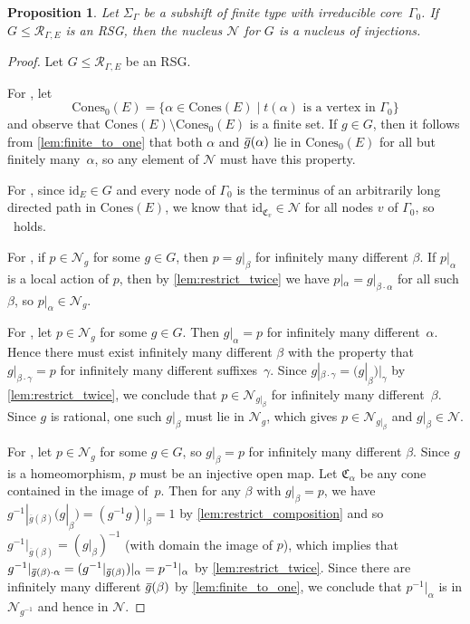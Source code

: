\documentclass[11pt,letterpaper]{amsart}
\newtheorem{proposition}[theorem]{Proposition}
\theoremstyle{definition}
\newcommand{\R}{\mathcal{R}}
\newcommand{\Nuc}{\mathcal{N}}
\newcommand{\C}{\mathfrak{C}}
\newcommand{\Cones}{\mathrm{Cones}}
\newcommand{\og}{\mkern 2mu\overline{\mkern-2mu g\mkern0.5mu}\mkern-0.5mu}
\begin{document}
\begin{proposition}\label{prop:NucleusHasProperties}
Let $\Sigma_\Gamma$ be a subshift of finite type with irreducible core~$\Gamma_0$. If $G\le \R_{\Gamma,E}$ is an RSG, then the nucleus $\Nuc$ for $G$ is a nucleus of injections.
\end{proposition}
\begin{proof}
Let $G\leq \R_{\Gamma,E}$ be an RSG.

For \MapNuc, let
\[
\Cones_0(E) = \{\alpha\in \Cones(E) \mid t(\alpha)\text{ is a vertex in $\Gamma_0$}\}
\]
and observe that $\Cones(E)\setminus \Cones_0(E)$ is a finite set. 
 If $g\in G$, then it follows from \cref{lem:finite_to_one} that both $\alpha$ and $\og(\alpha)$ lie in $\Cones_0(E)$ for all but finitely many~$\alpha$, so any element of $\Nuc$ must have this property.

For \IdNuc, since $\textrm{id}_E\in G$ and every node of $\Gamma_0$ is the terminus of an arbitrarily long directed path in $\Cones(E)$, we know that $\textrm{id}_{\C_v}\in\Nuc$ for all nodes $v$ of $\Gamma_0$, so \IdNuc\ holds. 

For \LocNuc, if $p\in \Nuc_g$ for some $g\in G$, then $p=g|_\beta$ for infinitely many different $\beta$.  If $p|_\alpha$ is a local action of $p$, then by \cref{lem:restrict_twice} we have $p|_\alpha=g|_{\beta\cdot\alpha}$ for all such $\beta$, so $p|_\alpha\in \Nuc_g$.

For \RecurNuc, let $p\in \Nuc_g$ for some $g\in G$. Then $g|_\alpha=p$ for infinitely many different~$\alpha$. Hence there must exist infinitely many different $\beta$ with the property that $g|_{\beta\cdot\gamma}=p$ for infinitely many different suffixes~$\gamma$. Since $g|_{\beta\cdot\gamma}=(g|_\beta)|_\gamma$ by \cref{lem:restrict_twice}, we conclude that  $p\in \Nuc_{g|_\beta}$ for infinitely many different~$\beta$.  Since $g$ is rational, one such $g|_\beta$ must lie in $\Nuc_g$, which gives $p\in \Nuc_{g|_\beta}$ and $g|_\beta\in \Nuc$.

For \InvNuc, let $p\in\Nuc_g$ for some $g\in G$, so $g|_\beta=p$ for infinitely many different $\beta$. Since $g$ is a homeomorphism, $p$ must be an injective open map.  Let $\C_\alpha$ be any cone contained in the image of~$p$.  Then for any $\beta$ with $g|_\beta=p$, we have $g^{-1}|_{\overline{g}(\beta)}(g|_\beta)=(g^{-1}g)|_\beta=1$ by \cref{lem:restrict_composition} and so $g^{-1}|_{\overline{g}(\beta)}=(g|_\beta)^{-1}$ (with domain the image of $p$), which implies that $g^{-1}|_{\og(\beta)\cdot \alpha} = (g^{-1}|_{\og(\beta)})|_\alpha = p^{-1}|_{\alpha}$ by \cref{lem:restrict_twice}.  Since there are infinitely many different $\og(\beta)$ by \cref{lem:finite_to_one}, we conclude that $p^{-1}|_\alpha$ is in $\Nuc_{g^{-1}}$ and hence in $\Nuc$.


\end{proof}
\end{document}
